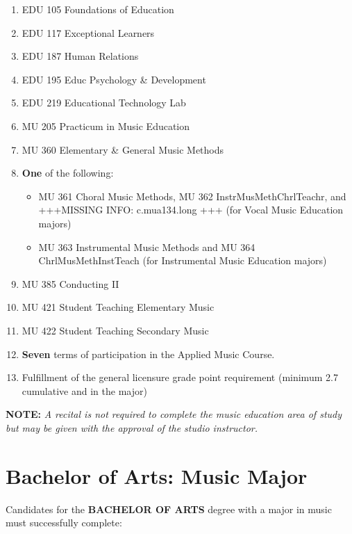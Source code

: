 \documentclass[
  letterpaper,
]{scrbook}
\providecommand{\tightlist}{%
  \setlength{\itemsep}{0pt}\setlength{\parskip}{0pt}}
\begin{document}
\begin{enumerate}
  \begin{enumerate}
  \def\labelenumii{\arabic{enumii}.}
  \tightlist
  \item
    EDU 105 Foundations of Education
  \item
    EDU 117 Exceptional Learners
  \item
    EDU 187 Human Relations
  \item
    EDU 195 Educ Psychology \& Development
  \item
    EDU 219 Educational Technology Lab
  \item
    MU 205 Practicum in Music Education
  \item
    MU 360 Elementary \& General Music Methods
  \item
    \textbf{One} of the following:

    \begin{itemize}
    \tightlist
    \item
      MU 361 Choral Music Methods, MU 362 InstrMusMethChrlTeachr, and
      +++MISSING INFO: c.mua134.long +++ (for Vocal Music Education
      majors)
    \item
      MU 363 Instrumental Music Methods and MU 364 ChrlMusMethInstTeach
      (for Instrumental Music Education majors)
    \end{itemize}
  \item
    MU 385 Conducting II
  \item
    MU 421 Student Teaching Elementary Music
  \item
    MU 422 Student Teaching Secondary Music
  \item
    \textbf{Seven} terms of participation in the Applied Music Course.
  \item
    Fulfillment of the general licensure grade point requirement
    (minimum 2.7 cumulative and in the major)
  \end{enumerate}
\end{enumerate}

\textbf{NOTE:} \emph{A recital is not required to complete the music
education area of study but may be given with the approval of the studio
instructor. }

\section{Bachelor of Arts: Music
Major}\label{bachelor-of-arts-music-major}

Candidates for the \textbf{BACHELOR OF ARTS} degree with a major in
music must successfully complete:
\end{document}
